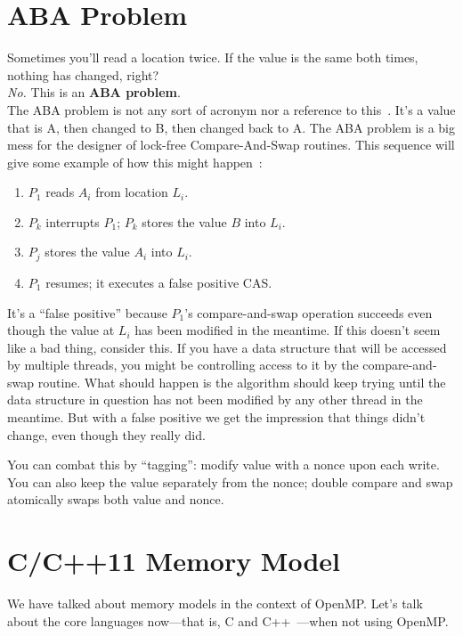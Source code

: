 \documentclass[a4paper]{report}
\begin{document}
\section*{ABA Problem}
Sometimes you'll read a location twice.
If the value is the same both times, nothing has changed, right?\\[1em]

\emph{No.} This is an {\bf ABA problem}.\\[1em]

The ABA problem is not any sort of acronym nor a reference to this~\cite{abba}. It's a value that is A, then changed to B, then changed back to A. The ABA problem is a big mess for the designer of lock-free Compare-And-Swap routines. This sequence will give some example of how this might happen~\cite{abaproblem}:

\begin{enumerate}
	\item $P_{1}$ reads $A_{i}$ from location $L_{i}$.
	\item $P_{k}$ interrupts $P_{1}$; $P_{k}$ stores the value $B$ into $L_{i}$.
	\item $P_{j}$ stores the value $A_{i}$ into $L_{i}$.
	\item $P_{1}$ resumes; it executes a false positive CAS.
\end{enumerate} 

It's a ``false positive'' because $P_{1}$'s compare-and-swap operation succeeds even though the value at $L_{i}$ has been modified in the meantime. If this doesn't seem like a bad thing, consider this. If you have a data structure that will be accessed by multiple threads, you might be controlling access to it by the compare-and-swap routine. What should happen is the algorithm should keep trying until the data structure in question has not been modified by any other thread in the meantime. But with a false positive we get the impression that things didn't change, even though they really did.

You can combat this by ``tagging'': modify value with a nonce upon each
write.  You can also keep the value separately from the nonce; double
compare and swap atomically swaps both value and nonce.

\section*{C/C++11 Memory Model}

We have talked about memory models in the context of OpenMP. Let's
talk about the core languages now---that is, C and C++~\cite{quora:cppthr, cppconcurrency}---when
not using OpenMP.
\end{document}
